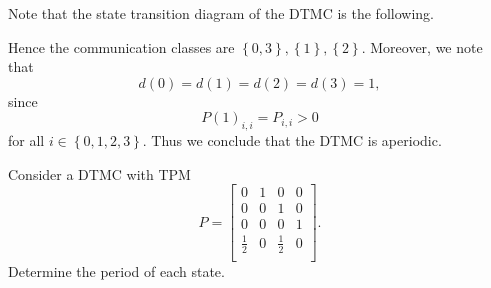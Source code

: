 \documentclass[stat333]{subfiles}
\begin{document}
    \begin{subproof}[Answer]
        Note that the state transition diagram of the DTMC is the following.
        \begin{center}
        \end{center}
        Hence the communication classes are $\left\lbrace 0,3 \right\rbrace, \left\lbrace 1 \right\rbrace, \left\lbrace 2 \right\rbrace$. Moreover, we note that
        \begin{equation*}
            d\left( 0 \right) = d\left( 1 \right) = d\left( 2 \right) = d\left( 3 \right) = 1,
        \end{equation*}
        since
        \begin{equation*}
            P{\left( 1 \right)}_{i,i} = P_{i,i} > 0
        \end{equation*}
        for all $i\in\left\lbrace 0,1,2,3 \right\rbrace$. Thus we conclude that the DTMC is aperiodic.
    \end{subproof}

    \ex Consider a DTMC with TPM
    \begin{equation*}
        P =
        \begin{bmatrix}
        	0 & 1 & 0 & 0 \\
        	0 & 0 & 1 & 0 \\
        	0 & 0 & 0 & 1 \\
        	\frac{1}{2} & 0 & \frac{1}{2} & 0 \\
        \end{bmatrix}.
    \end{equation*}
    Determine the period of each state.
\end{document}
